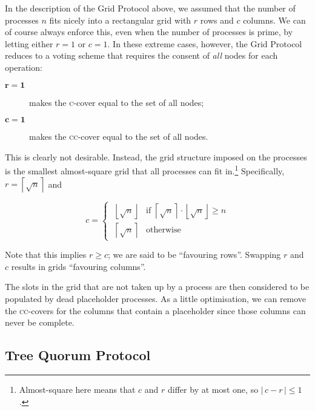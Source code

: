 \documentclass[12pt,chapterprefix=true,toc=bibliography,numbers=noendperiod,
               footnotes=multiple,twoside]{scrreprt}
\begin{document}

In the description of the Grid Protocol above, we assumed that the number of processes \(n\) fits nicely into a rectangular grid with \(r\) rows and \(c\) columns. We can of course always enforce this, even when the number of processes is prime, by letting either \(r = 1\) or \(c = 1\). In these extreme cases, however, the Grid Protocol reduces to a voting scheme that requires the consent of \emph{all} nodes for each operation:

\begin{description}
    \item[\(\mathbf{r = 1}\)] makes the \textsc{c}-cover equal to the set of all nodes;
    \item[\(\mathbf{c = 1}\)] makes the \textsc{cc}-cover equal to the set of all nodes.
\end{description}

This is clearly not desirable. Instead, the grid structure imposed on the processes is the smallest almost-square grid that all processes can fit in.\footnote{Almost-square here means that \(c\) and \(r\) differ by at most one, so \(|\,c - r\,| \leq 1\).} Specifically, \( r = \left\lceil \sqrt{n} \right\rceil \) and

\begin{equation}
    c =
    \begin{cases}
        \;\left\lfloor \sqrt{n} \right\rfloor
                 & \text{if } \left\lceil \sqrt{n} \right\rceil
                        \cdot \left\lfloor \sqrt{n} \right\rfloor \geq n \\[0.5em]
        \;\left\lceil \sqrt{n} \right\rceil & \text{otherwise}
    \end{cases}
    \label{eq:grid-dims}
\end{equation}

Note that this implies \(r \geq c\); we are said to be \enquote{favouring rows}. Swapping \(r\) and \(c\) results in grids \enquote{favouring columns}.

The slots in the grid that are not taken up by a process are then considered to be populated by dead placeholder processes. As a little optimisation, we can remove the \textsc{cc}-covers for the columns that contain a placeholder since those columns can never be complete.

\subsection{Tree Quorum Protocol}
\label{ssc:tree}
\end{document}
